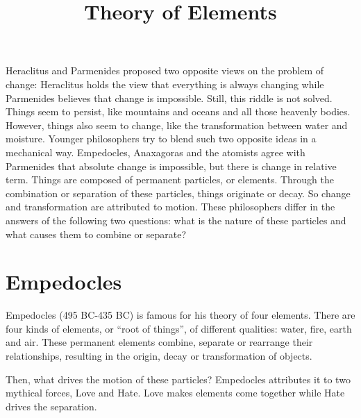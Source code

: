 \documentclass[11pt]{article}
\title{Theory of Elements}
\date{}
\begin{document}
\begin{sloppypar}
  \maketitle

  \linenumbers
Heraclitus and Parmenides proposed two opposite views on the problem of change: 
Heraclitus holds the view that everything is always changing while Parmenides believes that change is impossible. 
Still, this riddle is not solved. 
Things seem to persist, like mountains and oceans and all those heavenly bodies. 
However, things also seem to change, like the transformation between water and moisture. 
Younger philosophers try to blend such two opposite ideas in a mechanical way. 
Empedocles, Anaxagoras and the atomists agree with Parmenides that absolute change is impossible, but there is change in relative term. 
Things are composed of permanent particles, or elements. 
Through the combination or separation of these particles, things originate or decay. 
So change and transformation are attributed to motion. 
These philosophers differ in the answers of the following two questions: what is the nature of these particles and what causes them to combine or separate? 

\section{Empedocles}
Empedocles (495 BC-435 BC) is famous for his theory of four elements. 
There are four kinds of elements, or “root of things”, of different qualities: water, fire, earth and air. 
These permanent elements combine, separate or rearrange their relationships, resulting in the origin, decay or transformation of objects.

\par

Then, what drives the motion of these particles? 
Empedocles attributes it to two mythical forces, Love and Hate. 
Love makes elements come together while Hate drives the separation. 

\par


\end{sloppypar}
\end{document}
